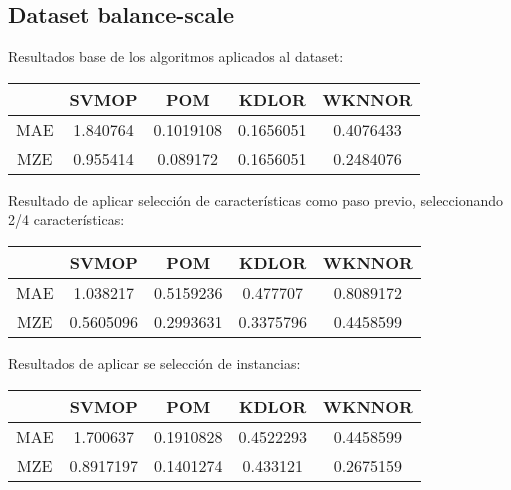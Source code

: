 \subsection{Dataset balance-scale}
Resultados base de los algoritmos aplicados al dataset:\\
\begin{center}
\begin{tabular}{ c c c c c }
	& SVMOP & POM & KDLOR & WKNNOR \\
	\hline	
MAE &	1.840764 & 0.1019108 & 0.1656051 & 0.4076433\\
MZE &	0.955414 & 0.089172 & 0.1656051 & 0.2484076 \\
	\hline  
\end{tabular} 
\end{center}
\vspace{20pt}
Resultado de aplicar selección de características como paso previo, seleccionando 2/4 características: \newline

\begin{center}
\begin{tabular}{ c c c c c }
	& SVMOP & POM & KDLOR & WKNNOR \\
	\hline	
	MAE &	1.038217 & 0.5159236 & 0.477707  & 0.8089172 \\
	MZE &	0.5605096 & 0.2993631 & 0.3375796  & 0.4458599  \\
	\hline  
\end{tabular}
\end{center}

Resultados de aplicar se selección de instancias:

\begin{center}
\begin{tabular}{ c c c c c }
	& SVMOP & POM & KDLOR & WKNNOR \\
	\hline	
	MAE &	1.700637 & 0.1910828 & 0.4522293  & 0.4458599 \\
	MZE &	0.8917197 & 0.1401274 & 0.433121  & 0.2675159  \\
	\hline  
\end{tabular}
\end{center}

